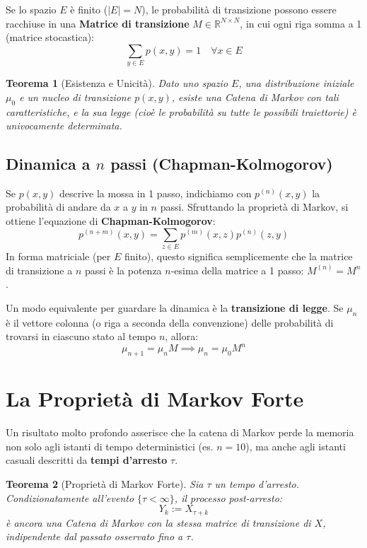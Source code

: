 \documentclass[11pt, a4paper]{report}
\theoremstyle{plain}
\newtheorem{theorem}{Teorema}[chapter]
\theoremstyle{definition}
\theoremstyle{remark}
\newcommand{\R}{\mathbb{R}}
\newcommand{\1}{\mathbf{1}}
\begin{document}
Se lo spazio $E$ è finito ($|E| = N$), le probabilità di transizione possono essere racchiuse in una \textbf{Matrice di transizione} $M \in \R^{N \times N}$, in cui ogni riga somma a 1 (matrice stocastica):
\[ \sum_{y \in E} p(x, y) = 1 \quad \forall x \in E \]

\begin{theorem}[Esistenza e Unicità]
Dato uno spazio $E$, una distribuzione iniziale $\mu_0$ e un nucleo di transizione $p(x, y)$, esiste una Catena di Markov con tali caratteristiche, e la sua legge (cioè le probabilità su tutte le possibili traiettorie) è univocamente determinata.
\end{theorem}

\subsection{Dinamica a $n$ passi (Chapman-Kolmogorov)}

Se $p(x,y)$ descrive la mossa in 1 passo, indichiamo con $p^{(n)}(x,y)$ la probabilità di andare da $x$ a $y$ in $n$ passi. Sfruttando la proprietà di Markov, si ottiene l'equazione di \textbf{Chapman-Kolmogorov}:
\[ p^{(n+m)}(x, y) = \sum_{z \in E} p^{(m)}(x, z) p^{(n)}(z, y) \]
In forma matriciale (per $E$ finito), questo significa semplicemente che la matrice di transizione a $n$ passi è la potenza $n$-esima della matrice a 1 passo: $M^{(n)} = M^n$.

Un modo equivalente per guardare la dinamica è la \textbf{transizione di legge}. Se $\mu_n$ è il vettore colonna (o riga a seconda della convenzione) delle probabilità di trovarsi in ciascuno stato al tempo $n$, allora:
\[ \mu_{n+1} = \mu_n M \implies \mu_n = \mu_0 M^n \]

\section{La Proprietà di Markov Forte}

Un risultato molto profondo asserisce che la catena di Markov perde la memoria non solo agli istanti di tempo deterministici (es. $n=10$), ma anche agli istanti casuali descritti da \textbf{tempi d'arresto} $\tau$.

\begin{theorem}[Proprietà di Markov Forte]
Sia $\tau$ un tempo d'arresto. Condizionatamente all'evento $\{\tau < \infty\}$, il processo post-arresto:
\[ Y_k := X_{\tau + k} \]
è ancora una Catena di Markov con la \emph{stessa} matrice di transizione di $X$, indipendente dal passato osservato fino a $\tau$.
\end{theorem}
\end{document}
